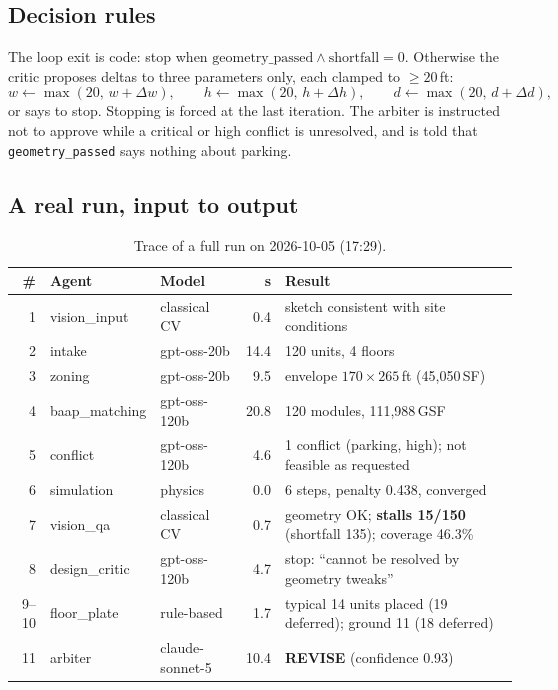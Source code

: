 \documentclass[10pt,a4paper]{article}
\newcommand{\code}[1]{\texttt{\small #1}}
\theoremstyle{definition}
\begin{document}
\subsection{Decision rules}
The loop exit is code: stop when $\text{geometry\_passed}\wedge \text{shortfall}=0$. Otherwise the critic proposes
deltas to three parameters only, each clamped to $\ge 20$\,ft:
\begin{equation}
w\leftarrow\max(20,\,w+\Delta w),\qquad h\leftarrow\max(20,\,h+\Delta h),\qquad d\leftarrow\max(20,\,d+\Delta d),
\end{equation}
or says to stop. Stopping is forced at the last iteration. The arbiter is instructed not to approve while a critical or
high conflict is unresolved, and is told that \code{geometry\_passed} says nothing about parking.

\subsection{A real run, input to output}

\begin{table}[H]
\centering\small
\caption{Trace of a full run on 2026-10-05 (17:29).}
\label{tab:run}
\begin{tabular}{@{}r l l r l@{}}
\toprule
\# & \textbf{Agent} & \textbf{Model} & \textbf{s} & \textbf{Result} \\ \midrule
1 & vision\_input & classical CV & 0.4 & sketch consistent with site conditions \\
2 & intake & gpt-oss-20b & 14.4 & 120 units, 4 floors \\
3 & zoning & gpt-oss-20b & 9.5 & envelope $170\times265$\,ft (45,050\,SF) \\
4 & baap\_matching & gpt-oss-120b & 20.8 & 120 modules, 111,988\,GSF \\
5 & conflict & gpt-oss-120b & 4.6 & 1 conflict (parking, high); not feasible as requested \\
6 & simulation & physics & 0.0 & 6 steps, penalty 0.438, converged \\
7 & vision\_qa & classical CV & 0.7 & geometry OK; \textbf{stalls 15/150} (shortfall 135); coverage 46.3\% \\
8 & design\_critic & gpt-oss-120b & 4.7 & stop: ``cannot be resolved by geometry tweaks'' \\
9--10 & floor\_plate & rule-based & 1.7 & typical 14 units placed (19 deferred); ground 11 (18 deferred) \\
11 & arbiter & claude-sonnet-5 & 10.4 & \textbf{REVISE} (confidence 0.93) \\
\bottomrule
\end{tabular}
\end{table}
\end{document}

